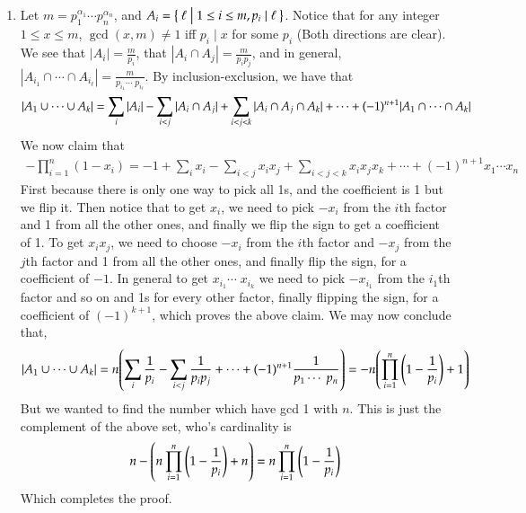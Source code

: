 \documentclass[12pt]{article}
\theoremstyle{definitionstyle}
\begin{document}
\begin{enumerate}[leftmargin=\labelsep]
		\item Let $m = p_1^{\alpha_1} \cdots p_n^{\alpha_n}$, and $A_i = \Set{ \ell | 1 \leq i \leq m, p_i \mid \ell}$. Notice that for any integer $1 \leq x \leq m$, $\gcd(x, m) \neq 1$ iff $p_i \mid x$ for some $p_i$ (Both directions are clear). We see that $|A_i| = \frac{m}{p_i}$, that $|A_i \cap A_j| = \frac{m}{p_ip_j}$, and in general, $|A_{i_1} \cap \cdots \cap A_{i_\ell}| = \frac{m}{p_{i_1}  \cdots  \; p_{i_\ell}}$. By inclusion-exclusion, we have that
		\begin{align*}
			\qty|A_1 \cup \cdots \cup A_k| = \sum_{i} |A_i| - \sum_{i < j} |A_i \cap A_j| + \sum_{i < j < k} |A_i \cap A_j \cap A_k| + \cdots + (-1)^{n+1} \qty|A_1 \cap \cdots \cap A_k|
		\end{align*}
		We now claim that
		\begin{align*}
			-\prod_{i=1}^n (1-x_i) = -1+\sum_i x_i - \sum_{i < j} x_ix_j + \sum_{i < j < k} x_ix_jx_k + \cdots + (-1)^{n+1} x_1 \cdots x_n
		\end{align*}
		First because there is only one way to pick all 1s, and the coefficient is 1 but we flip it. Then notice that to get $x_i$, we need to pick $-x_i$ from the $i$th factor and 1 from all the other ones, and finally we flip the sign to get a coefficient of 1. To get $x_ix_j$, we need to choose $-x_i$ from the $i$th factor and $-x_j$ from the $j$th factor and 1 from all the other ones, and finally flip the sign, for a coefficient of $-1$. In general to get $x_{i_1} \cdots \; x_{i_k}$ we need to pick $-x_{i_1}$ from the $i_1$th factor and so on and 1s for every other factor, finally flipping the sign, for a coefficient of $(-1)^{k+1}$, which proves the above claim. We may now conclude that,
		\begin{align*}
			|A_1 \cup \cdots \cup A_k| = n\qty(\sum_i \frac{1}{p_i} - \sum_{i < j} \frac{1}{p_ip_j} + \cdots + (-1)^{n+1} \frac{1}{p_1 \cdots \; p_n}) = -n \qty(\prod_{i=1}^n \qty(1-\frac{1}{p_i})+1)
		\end{align*}
		But we wanted to find the number which have gcd 1 with $n$. This is just the complement of the above set, who's cardinality is
		\begin{align*}
			n - \qty(n\prod_{i=1}^n \qty(1-\frac{1}{p_i})+n) = n\prod_{i=1}^n \qty(1-\frac{1}{p_i})
		\end{align*}
		Which completes the proof.
		
		
	\end{enumerate}
\end{document}
